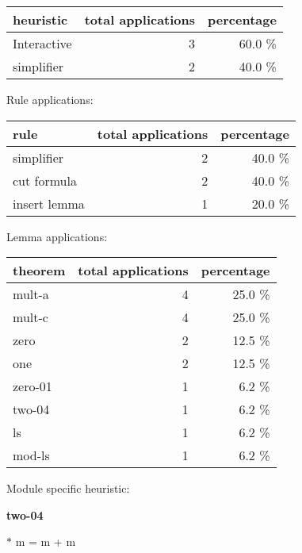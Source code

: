 \documentclass[a4paper]{article}
\begin{document}
\begin{supertabular}{l|r|r}
heuristic	& total applications & percentage \\ \hline
Interactive & 3 & 60.0 \% \\
simplifier & 2 & 40.0 \% \\

\end{supertabular}

Rule applications:

\begin{supertabular}{l|r|r}
rule	        & total applications & percentage \\ \hline
simplifier & 2 & 40.0 \% \\
cut formula & 2 & 40.0 \% \\
insert lemma & 1 & 20.0 \% \\

\end{supertabular}

Lemma applications:

\begin{supertabular}{l|r|r}
theorem	        & total applications & percentage \\ \hline
mult-a & 4 & 25.0 \% \\
mult-c & 4 & 25.0 \% \\
zero & 2 & 12.5 \% \\
one & 2 & 12.5 \% \\
zero-01 & 1 & 6.2 \% \\
two-04 & 1 & 6.2 \% \\
ls & 1 & 6.2 \% \\
mod-ls & 1 & 6.2 \% \\

\end{supertabular}

Module specific heuristic:

\pagebreak

{\LARGE\bf two-04}\label{lemma-two-04}

\medskip

  $*$ m = m + m
\end{document}
